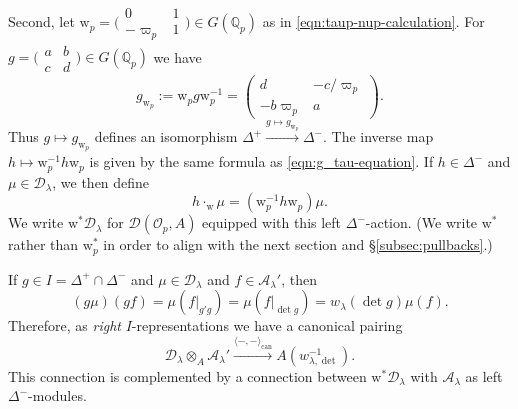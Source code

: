 \documentclass[10pt, twoside]{amsart}
\theoremstyle{plain}
\theoremstyle{definition}
\theoremstyle{remark}
\numberwithin{equation}{subsection}
\def\Q{\mathbb Q}
\def\can{\mathrm{can}}
\def\can{\mathrm{can}}
\def\scro{\mathscr O}
\def\scra{\mathscr A}
\def\scrd{\mathscr D}
\def\scro{\mathscr O}
\newcommand{\smallmat}[4]{\bigl(\begin{smallmatrix}#1&#2\\#3&#4\end{smallmatrix}\bigr)}
\begin{document}
Second, let ${ \boldsymbol{\mathrm{w}}}_p = \smallmat 01{-\varpi_p}1 \in G(\Q_p)$ as in \eqref{eqn:taup-nup-calculation}. For $g = \smallmat abcd \in G(\Q_p)$ we have
\begin{equation}\label{eqn:g_tau-equation}
g_{{ \boldsymbol{\mathrm{w}}}_p} := { \boldsymbol{\mathrm{w}}}_p g { \boldsymbol{\mathrm{w}}}_p^{-1} = \begin{pmatrix} d & -c/\varpi_p \\ -b\varpi_p & a\end{pmatrix}.
\end{equation}
Thus $g \mapsto g_{{ \boldsymbol{\mathrm{w}}}_p}$ defines an isomorphism $\Delta^+ \xrightarrow{g\mapsto g_{{ \boldsymbol{\mathrm{w}}}_p}} \Delta^-$. The inverse map $h \mapsto { \boldsymbol{\mathrm{w}}}_p^{-1} h { \boldsymbol{\mathrm{w}}}_p$ is given by the same formula as \eqref{eqn:g_tau-equation}. If $h \in \Delta^-$ and $\mu \in \scrd_{\lambda}$, we then define
$$
h\cdot_{{ \boldsymbol{\mathrm{w}}}} \mu = ({ \boldsymbol{\mathrm{w}}}_p^{-1}h{ \boldsymbol{\mathrm{w}}}_p) \mu.
$$
We write ${ \boldsymbol{\mathrm{w}}}^{\ast}\scrd_{\lambda}$ for $\scrd(\scro_p,A)$ equipped with this left $\Delta^-$-action.  (We write ${ \boldsymbol{\mathrm{w}}}^{\ast}$ rather than ${ \boldsymbol{\mathrm{w}}}_p^{\ast}$ in order to align with the next section and \S \ref{subsec:pullbacks}.)

If $g \in I = \Delta^+ \cap \Delta^-$ and $\mu \in \scrd_\lambda$ and $f \in \scra_{\lambda}'$, then
$$
(g\mu)(gf) = \mu(f|_{g'g}) = \mu(f|_{\det g}) = w_{\lambda}(\det g) \mu(f).
$$
Therefore, as {\em right} $I$-representations we have a canonical pairing
\begin{equation}\label{eqn:canonical-pairing-dist}
\scrd_\lambda \otimes_A \scra_\lambda' \xrightarrow{\langle - , - \rangle_{\can}} A(w_{\lambda,\det}^{-1}).
\end{equation}
This connection is complemented by a connection between ${ \boldsymbol{\mathrm{w}}}^{\ast}\scrd_{\lambda}$ with $\scra_\lambda$ as left $\Delta^-$-modules.
\end{document}
